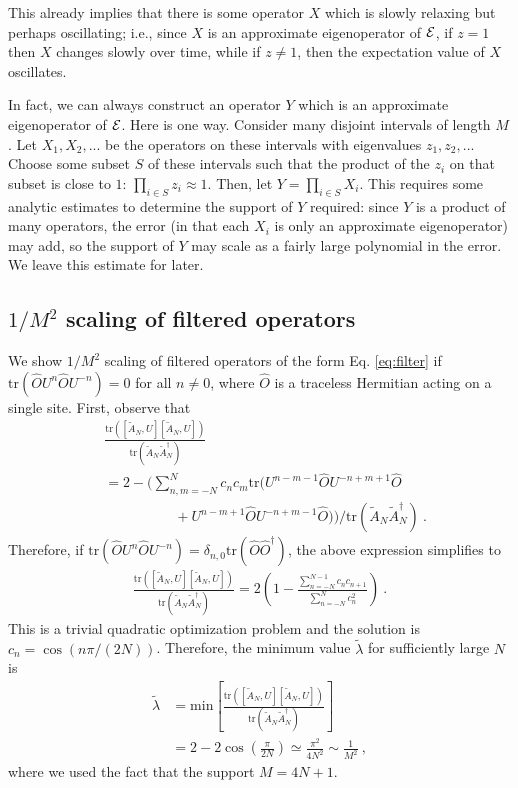 \documentclass[twocolumn,superscriptaddress, prb]{revtex4-1}
\begin{document}
This already implies that there is some operator $X$ which is slowly relaxing but perhaps oscillating; i.e., since $X$ is an approximate eigenoperator of ${\cal E}$, if $z=1$ then $X$ changes slowly over time, while if $z \neq 1$, then the expectation value of $X$ oscillates.

In fact, we can always construct an operator $Y$ which is an approximate eigenoperator of ${\cal E}$.  Here is one way.  Consider many disjoint intervals of length $M$.  Let $X_1,X_2,...$ be the operators on these intervals with eigenvalues $z_1,z_2,...$  Choose some subset $S$ of these intervals such that the product of the $z_i$ on that subset is close to $1$: $\prod_{i \in S} z_i \approx 1$.  Then, let $Y=\prod_{i \in S} X_i$.  This requires some analytic estimates to determine the support of $Y$ required: since $Y$ is a product of many operators, the error (in that each $X_i$ is only an approximate eigenoperator) may add, so the support of $Y$ may scale as a fairly large polynomial in the error.  We leave this estimate for later.

\subsection{$1/M^2$ scaling of filtered operators}
We show $1/M^2$ scaling of filtered operators of the form Eq. \eqref{eq:filter} if $\mathrm{tr}(\hat{O}U^n \hat{O}U^{-n}) = 0$ for all $n\neq 0$, 
where $\hat{O}$ is a traceless Hermitian acting on a single site.
First, observe that
\begin{align}
& \frac{\mathrm{tr}([\tilde{A}_N,U][\tilde{A}_N,U])}{\mathrm{tr}(\tilde{A}_N\tilde{A}_N^\dag)} \nonumber\\
&=2 - \bigg(\sum_{n,m = -N}^{N}c_n c_m \mathrm{tr}(U^{n-m-1}\hat{O}U^{-n+m+1}\hat{O} \nonumber\\
&\quad\quad\quad\quad\quad + U^{n-m+1}\hat{O}U^{-n+m-1}\hat{O})\bigg)/\mathrm{tr}(\tilde{A}_N\tilde{A}_N^\dag) ~.
\end{align}
Therefore, if $\mathrm{tr}(\hat{O}U^n \hat{O}U^{-n}) = \delta_{n,0}\mathrm{tr}(\hat{O}\hat{O}^\dag)$,
the above expression simplifies to
\begin{align}
\frac{\mathrm{tr}([\tilde{A}_N,U][\tilde{A}_N,U])}{\mathrm{tr}(\tilde{A}_N\tilde{A}_N^\dag)}=2\left(1 - \frac{\sum_{n=-N}^{N-1}c_n c_{n+1}}{\sum_{n=-N}^N c_n^2}\right) ~.
\end{align}
This is a trivial quadratic optimization problem and the solution is $c_n = \cos(n\pi/(2N))$.
Therefore, the minimum value $\tilde{\lambda}$ for sufficiently large $N$ is
\begin{align}
\tilde{\lambda} &= \mathrm{min}\left[\frac{\mathrm{tr}([\tilde{A}_N,U][\tilde{A}_N,U])}{\mathrm{tr}(\tilde{A}_N\tilde{A}_N^\dag)} \right] \nonumber\\
&= 2 - 2\cos\left(\frac{\pi}{2N}\right) \simeq \frac{\pi^2}{4N^2} \sim \frac{1}{M^2} ~,
\end{align}
where we used the fact that the support $M = 4N +1 $. 
\end{document}
